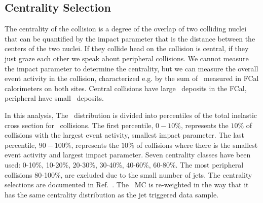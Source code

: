 \subsection{Centrality Selection}
\label{sec:cent}

The centrality of the collision is a degree of the overlap of two colliding nuclei that can be quantified by the impact parameter that is the distance between the centers of the two nuclei. If they collide head on the collision is central, if they just graze each other we speak about peripheral collisions. We cannot measure the impact parameter to determine the centrality, but we can measure the overall event activity in the collision, characterized e.g. by the sum of \Et\ measured in FCal calorimeters on both sites. Central collisions have large \Et\ deposits in the FCal, peripheral have small \Et\ deposits.

In this analysis, The \ETfcal\ distribution is divided into percentiles of the total inelastic cross section for \PbPb\ collisions. The first percentile, $0-10\%$, represents the $10\%$ of collisions with the largest event activity, smallest impact parameter. The last percentile, $90-100\%$, represents the $10\%$ of collisions where there is the smallest event activity and largest impact parameter. 
Seven centrality classes have been used: 0-10\%, 10-20\%, 20-30\%, 30-40\%, 40-60\%, 60-80\%. 
The most peripheral collisions 80-100\%, are excluded due to  the small number of jets.
The centrality selections are documented in Ref.~\cite{ref:centrality}. The \PbPb\ MC is re-weighted in the way that it has the same centrality distribution as the jet triggered data sample.

\clearpage
